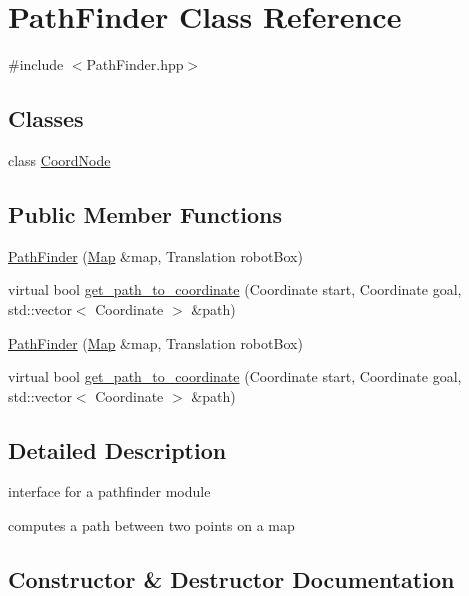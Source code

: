 \hypertarget{class_path_finder}{}\section{Path\+Finder Class Reference}
\label{class_path_finder}


{\ttfamily \#include $<$Path\+Finder.\+hpp$>$}

\subsection*{Classes}
\begin{DoxyCompactItemize}
\item 
class \hyperlink{class_path_finder_1_1_coord_node}{Coord\+Node}
\end{DoxyCompactItemize}
\subsection*{Public Member Functions}
\begin{DoxyCompactItemize}
\item 
\hyperlink{class_path_finder_a820a04a9ec65349b10cf21898bc89227}{Path\+Finder} (\hyperlink{class_map}{Map} \&map, Translation robot\+Box)
\item 
virtual bool \hyperlink{class_path_finder_acada549f3bc9792d9c4031484f017725}{get\+\_\+path\+\_\+to\+\_\+coordinate} (Coordinate start, Coordinate goal, std\+::vector$<$ Coordinate $>$ \&path)
\item 
\hyperlink{class_path_finder_a820a04a9ec65349b10cf21898bc89227}{Path\+Finder} (\hyperlink{class_map}{Map} \&map, Translation robot\+Box)
\item 
virtual bool \hyperlink{class_path_finder_a0c572b99f2c8cb944ebf49ad502cba7f}{get\+\_\+path\+\_\+to\+\_\+coordinate} (Coordinate start, Coordinate goal, std\+::vector$<$ Coordinate $>$ \&path)
\end{DoxyCompactItemize}


\subsection{Detailed Description}
interface for a pathfinder module

computes a path between two points on a map 

\subsection{Constructor \& Destructor Documentation}
